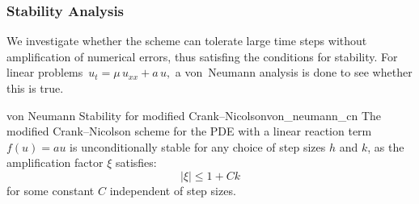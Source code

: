 \subsubsection{Stability Analysis}
We investigate whether the scheme can tolerate large time steps without amplification of numerical errors, thus
satisfing the conditions for stability.
For linear problems
\(\,u_t = \mu\,u_{xx} + a\,u,\) a von~Neumann analysis is done to see whether
this is true.

\begin{theorem}{von Neumann Stability for modified Crank--Nicolson}{von_neumann_cn}
  The modified Crank--Nicolson scheme for the PDE with a linear reaction term $f(u) = au$ is unconditionally
  stable for any choice of step sizes $h$ and $k$, as the amplification factor $\xi$ satisfies:
  \[
    |\xi| \leq 1 + Ck
  \]
  for some constant $C$ independent of step sizes.
\end{theorem}


